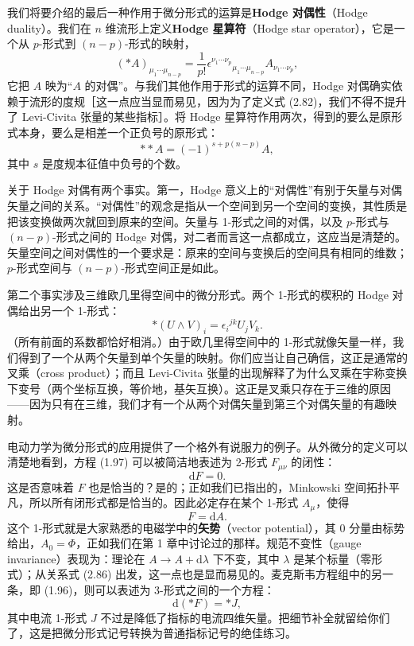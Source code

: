 我们将要介绍的最后一种作用于微分形式的运算是\textbf{Hodge 对偶性}（Hodge duality）。我们在 $n$ 维流形上定义\textbf{Hodge 星算符}（Hodge star operator），它是一个从 $p$-形式到 $(n-p)$-形式的映射，
\begin{equation*}
(*A)_{\mu_{1}\cdots\mu_{n-p}}=\frac{1}{p!}\epsilon^{\nu_{1}\cdots\nu_{p}}{}_{\mu_{1}\cdots\mu_{n-p}}A_{\nu_{1}\cdots\nu_{p}}, \tag{2.82}
\end{equation*}
它把 $A$ 映为“$A$ 的对偶”。与我们其他作用于形式的运算不同，Hodge 对偶确实依赖于流形的度规［这一点应当显而易见，因为为了定义式 (2.82)，我们不得不提升了 Levi-Civita 张量的某些指标］。将 Hodge 星算符作用两次，得到的要么是原形式本身，要么是相差一个正负号的原形式：
\begin{equation*}
**A=(-1)^{s+p(n-p)}A, \tag{2.83}
\end{equation*}
其中 $s$ 是度规本征值中负号的个数。

关于 Hodge 对偶有两个事实。第一，Hodge 意义上的“对偶性”有别于矢量与对偶矢量之间的关系。“对偶性”的观念是指从一个空间到另一个空间的变换，其性质是把该变换做两次就回到原来的空间。矢量与 1-形式之间的对偶，以及 $p$-形式与 $(n-p)$-形式之间的 Hodge 对偶，对二者而言这一点都成立，这应当是清楚的。矢量空间之间对偶性的一个要求是：原来的空间与变换后的空间具有相同的维数；$p$-形式空间与 $(n-p)$-形式空间正是如此。

第二个事实涉及三维欧几里得空间中的微分形式。两个 1-形式的楔积的 Hodge 对偶给出另一个 1-形式：
\begin{equation*}
*(U\wedge V)_{i}=\epsilon_{i}{}^{jk}U_{j}V_{k}. \tag{2.84}
\end{equation*}
（所有前面的系数都恰好相消。）由于欧几里得空间中的 1-形式就像矢量一样，我们得到了一个从两个矢量到单个矢量的映射。你们应当让自己确信，这正是通常的叉乘（cross product）；而且 Levi-Civita 张量的出现解释了为什么叉乘在宇称变换下变号（两个坐标互换，等价地，基矢互换）。这正是叉乘只存在于三维的原因——因为只有在三维，我们才有一个从两个对偶矢量到第三个对偶矢量的有趣映射。

电动力学为微分形式的应用提供了一个格外有说服力的例子。从外微分的定义可以清楚地看到，方程 (1.97) 可以被简洁地表述为 2-形式 $F_{\mu\nu}$ 的闭性：
\begin{equation*}
\mathrm{d}F=0. \tag{2.85}
\end{equation*}
这是否意味着 $F$ 也是恰当的？是的；正如我们已指出的，Minkowski 空间拓扑平凡，所以所有闭形式都是恰当的。因此必定存在某个 1-形式 $A_{\mu}$，使得
\begin{equation*}
F=\mathrm{d}A. \tag{2.86}
\end{equation*}
这个 1-形式就是大家熟悉的电磁学中的\textbf{矢势}（vector potential），其 0 分量由标势给出，$A_{0}=\Phi$，正如我们在第 1 章中讨论过的那样。规范不变性（gauge invariance）表现为：理论在 $A\to A+\mathrm{d}\lambda$ 下不变，其中 $\lambda$ 是某个标量（零形式）；从关系式 (2.86) 出发，这一点也是显而易见的。麦克斯韦方程组中的另一条，即 (1.96)，则可以表述为 3-形式之间的一个方程：
\begin{equation*}
\mathrm{d}(*F)=*J, \tag{2.87}
\end{equation*}
其中电流 1-形式 $J$ 不过是降低了指标的电流四维矢量。把细节补全就留给你们了，这是把微分形式记号转换为普通指标记号的绝佳练习。

